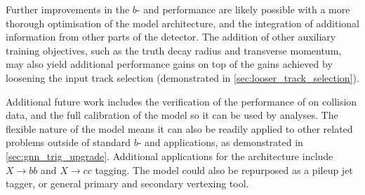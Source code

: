 Further improvements in the $b$- and \ctagging performance are likely possible with a more thorough optimisation of the model architecture, and the integration of additional information from other parts of the \ATLAS detector.
The addition of other auxiliary training objectives, such as the truth \bhadron decay radius and transverse momentum, may also yield additional performance gains on top of the gains achieved by loosening the input track selection (demonstrated in \cref{sec:looser_track_selection}).

Additional future work includes the verification of the performance of \GNN on collision data, and the full calibration of the model so it can be used by analyses.
The flexible nature of the model means it can also be readily applied to other related problems outside of standard $b$- and \ctagging applications, as demonstrated in \cref{sec:gnn_trig_upgrade}.
Additional applications for the architecture include $X \rightarrow bb$ and $X \rightarrow cc$ tagging.
The model could also be repurposed as a pileup jet tagger, or general primary and secondary vertexing tool.

